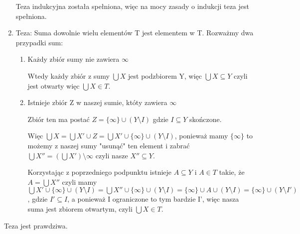 \documentclass[12pt,a4paper]{article}
\begin{document}
\begin{enumerate}
    Teza indukcyjna została spełniona, więc na mocy zasady o indukcji teza jest spełniona.
    \newpage
    \item Teza: Suma dowolnie wielu elementów T jest elementem w T.
    Rozważmy dwa przypadki sum:
    \begin{enumerate}
        \item Każdy zbiór sumy nie zawiera $\infty$
        
        Wtedy każdy zbiór z sumy $\bigcup X$ jest podzbiorem Y, więc $\bigcup X \subseteq Y$ czyli jest otwarty więc $\bigcup X \in T$.
        
        \item Istnieje zbiór Z w naszej sumie, któty zawiera $\infty$
        
        Zbiór ten ma postać $Z = \{\infty\} \cup (Y\setminus I)$ gdzie $I\subseteq Y$ skończone.
        
        Więc $\bigcup X = \bigcup X' \cup Z = \bigcup X' \cup \{\infty\} \cup (Y\setminus I)$, ponieważ mamy $\{\infty\}$ to możemy z naszej sumy "usunąć" ten element i zabrać $\bigcup X'' = (\bigcup X') \setminus \infty$ czyli nasze $X'' \subseteq Y$.
        
        Korzystając z poprzedniego podpunktu istnieje $A \subseteq Y$ i $A \in T$ takie, że  $A = \bigcup X''$ czyli mamy $\bigcup X' \cup \{\infty\} \cup (Y\setminus I) = \bigcup X'' \cup \{\infty\} \cup (Y\setminus I) = \{\infty\} \cup A \cup (Y\setminus I) = \{\infty\} \cup (Y\setminus I')$, gdzie $I' \subseteq I$, a ponieważ I ograniczone to tym bardzie I', więc nasza suma jest zbiorem otwartym, czyli $\bigcup X \in T$.
    \end{enumerate}
\end{enumerate}
    Teza jest prawdziwa.
    
\end{document}
